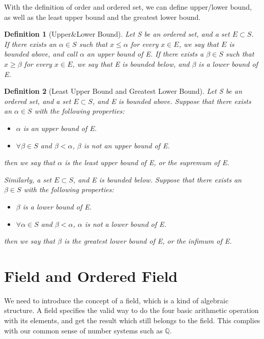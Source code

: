 \documentclass[onecolumn]{article}
\newtheorem{definition}{Definition}
\begin{document}
With the definition of order and ordered set, we can define upper/lower bound, 
as well as the least upper bound and the greatest lower bound.

\begin{definition}[Upper\&Lower Bound]
  Let S be an ordered set, and a set $E \subset S$. If there exists an 
  $\alpha \in S$ such that $x \leq \alpha$ for every $x \in E$, we say that $E$ 
  is bounded above, and call $\alpha$ an upper bound of E. If there exists a 
  $\beta \in S$ such that $x \geq \beta$ for every $x \in E$, we say that E is 
  bounded below, and $\beta$ is a lower bound of E.
\end{definition}

\begin{definition}[Least Upper Bound and Greatest Lower Bound]
  Let S be an ordered set, and a set $E \subset S$, and E is bounded above. 
  Suppose that there exists an $\alpha \in S$ with the following properties:
  \begin{itemize}
    \item $\alpha$ is an upper bound of E.
    \item $\forall \beta \in S$ and $\beta < \alpha$, $\beta$ is not an upper 
    bound of E.
  \end{itemize}
  then we say that $\alpha$ is the least upper bound of E, or the supremum of E.
  
  Similarly, a set $E \subset S$, and E is bounded below. Suppose that there 
  exists an $\beta \in S$ with the following properties:
  \begin{itemize}
    \item $\beta$ is a lower bound of E.
    \item $\forall \alpha \in S$ and $\beta < \alpha$, $\alpha$ is not a lower 
    bound of E.
  \end{itemize}
  then we say that $\beta$ is the greatest lower bound of E, or the infimum of E.
\end{definition}

\section{Field and Ordered Field}

We need to introduce the concept of a field, which is a kind of algebraic 
structure. A field specifies the valid way to do the four basic arithmetic 
operation with its elements, and get the result which still belongs to the 
field. This complies with our common sense of number systems such as 
$\mathbb{Q}$.
\end{document}
